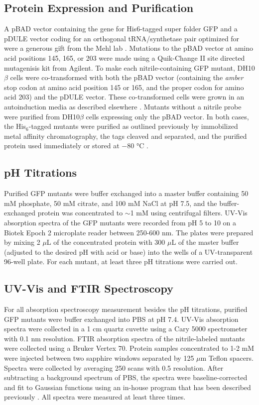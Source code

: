 \subsection{Protein Expression and Purification}

A pBAD vector containing the gene for His6-tagged super folder GFP and a pDULE vector coding for an orthogonal tRNA/synthetase pair optimized for \pCNF{} were a generous gift from the Mehl lab \cite{Miyake-Stoner2010}.
Mutations to the pBAD vector at amino acid positions 145, 165, or 203 were made using a Quik-Change II site directed mutagenisis kit from Agilent.
To make each nitrile-containing GFP mutant, DH10$\beta$ cells were co-transformed with both the pBAD vector (containing the \emph{amber} stop codon at amino acid position 145 or 165, and the proper codon for amino acid 203) and the pDULE vector. 
These co-transformed cells were grown in an autoinduction media as described elsewhere \cite{Hammill2007}.
Mutants without a nitrile probe were purified from DH10$\beta$ cells expressing only the pBAD vector. 
In both cases, the His$_6$-tagged mutants were purified as outlined previously by immobilized metal affinity chromatography, the tags cleaved and separated, and the purified protein used immediately or stored at $-80$ \si{\celsius} \cite{Slocum2016}. 

\subsection{pH Titrations}

Purified GFP mutants were buffer exchanged into a master buffer containing 50 \si{mM} phosphate, 50 mM citrate, and 100 mM NaCl at pH 7.5, and the buffer-exchanged protein was concentrated to $\sim$1 mM using centrifugal filters. 
UV-Vis absorption spectra of the GFP mutants were recorded from pH 5 to 10 on a Biotek Epoch 2 microplate reader between 250-600 nm. 
The plates were prepared by mixing 2 $\mu$L of the concentrated protein with 300 $\mu$L of the master buffer (adjusted to the desired pH with acid or base) into the wells of a UV-transparent 96-well plate. 
For each mutant, at least three pH titrations were carried out.

\subsection{UV-Vis and FTIR Spectroscopy}

For all absorption spectroscopy measurement besides the pH titrations, purified GFP mutants were buffer exchanged into PBS at pH 7.4. 
UV-Vis absorption spectra were collected in a 1 cm quartz cuvette using a Cary 5000 spectrometer with 0.1 nm resolution. 
FTIR absorption spectra of the nitrile-labeled mutants were collected using a Bruker Vertex 70. 
Protein samples concentrated to 1-2 mM were injected between two sapphire windows separated by 125 $\mu$m Teflon spacers. 
Spectra were collected by averaging 250 scans with 0.5 \si{\wn} resolution. 
After subtracting a background spectrum of PBS, the spectra were baseline-corrected and fit to Gaussian functions using an in-house program that has been described previously \cite{Ragain2012}.
All spectra were measured at least three times.   

